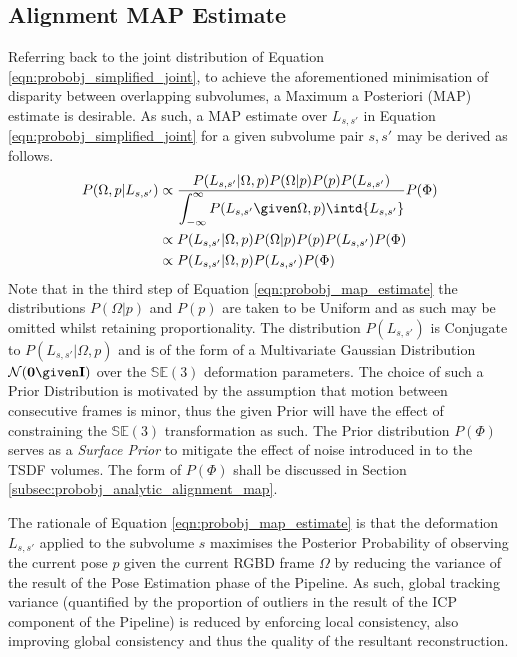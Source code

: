 \subsection{Alignment MAP Estimate}
\label{subsec:probobj_alignment_map}
Referring back to the joint distribution of Equation
\ref{eqn:probobj_simplified_joint}, to achieve the aforementioned minimisation
of disparity between overlapping subvolumes, a Maximum a Posteriori (MAP)
estimate is desirable. As such, a MAP estimate over $L_{s, s'}$ in Equation
\ref{eqn:probobj_simplified_joint} for a given subvolume pair $s, s'$ may be
derived as follows.
\begin{equation}
  \label{eqn:probobj_map_estimate}
  \begin{split}
    P(\Omega, p | L_{s, s'}) & \propto \frac{P(L_{s, s'} | \Omega, p) 
    P(\Omega | p)P(p)P(L_{s, s'})}
    {\displaystyle\int_{-\infty}^{\infty} P(L_{s, s'} \given \Omega, p)
    \intd{L_{s, s'}}} P(\Phi) \\
    & \propto P(L_{s, s'} | \Omega, p) P(\Omega | p)P(p)P(L_{s, s'})P(\Phi) \\
    & \propto P(L_{s, s'} | \Omega, p)P(L_{s, s'})P(\Phi)
  \end{split}
\end{equation}
Note that in the third step of Equation \ref{eqn:probobj_map_estimate} the
distributions $P(\Omega | p)$ and $P(p)$ are taken to be Uniform and as such may
be omitted whilst retaining proportionality. The distribution $P(L_{s, s'})$ is
Conjugate to $P(L_{s, s'} | \Omega, p)$ and is of the form of a Multivariate
Gaussian Distribution $\mathcal{N}(\mathbf{0} \given \mathbf{I})$ over the
$\mathbb{SE}(3)$ deformation parameters. The choice of such a Prior Distribution
is motivated by the assumption that motion between consecutive frames is minor,
thus the given Prior will have the effect of constraining the $\mathbb{SE}(3)$
transformation as such. The Prior distribution $P(\Phi)$ serves as a
\textit{Surface Prior} to mitigate the effect of noise introduced in to the TSDF
volumes. The form of $P(\Phi)$ shall be discussed in Section
\ref{subsec:probobj_analytic_alignment_map}.

The rationale of Equation \ref{eqn:probobj_map_estimate} is that the deformation
$L_{s, s'}$ applied to the subvolume $s$ maximises the Posterior Probability of
observing the current pose $p$ given the current RGBD frame $\Omega$ by reducing
the variance of the result of the Pose Estimation phase of the Pipeline. As such,
global tracking variance (quantified by the proportion of outliers in the result
of the ICP component of the Pipeline) is reduced by enforcing local consistency,
also improving global consistency and thus the quality of the resultant
reconstruction.

